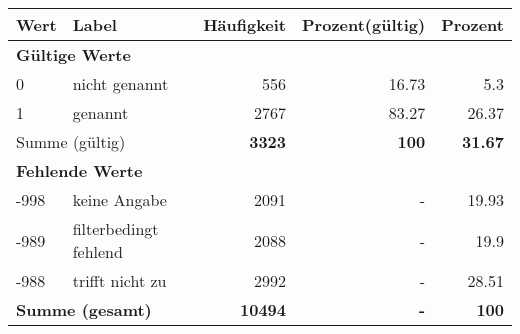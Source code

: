      \begin{longtable}{lXrrr}
     \toprule
     \textbf{Wert} & \textbf{Label} & \textbf{Häufigkeit} & \textbf{Prozent(gültig)} & \textbf{Prozent} \\
     \endhead
     \midrule
     \multicolumn{5}{l}{\textbf{Gültige Werte}}\\

     0 &
     \multicolumn{1}{X}{ nicht genannt   } &


       \num{556} &
       \num[round-mode=places,round-precision=2]{16.73} &
         \num[round-mode=places,round-precision=2]{5.3} \\

     1 &
     \multicolumn{1}{X}{ genannt   } &


       \num{2767} &
       \num[round-mode=places,round-precision=2]{83.27} &
         \num[round-mode=places,round-precision=2]{26.37} \\
     \midrule
     \multicolumn{2}{l}{Summe (gültig)} &
       \textbf{\num{3323}} &
     \textbf{\num{100}} &
       \textbf{\num[round-mode=places,round-precision=2]{31.67}} \\
     \multicolumn{5}{l}{\textbf{Fehlende Werte}}\\
       -998 &
       keine Angabe &
         \num{2091} &
        - &
         \num[round-mode=places,round-precision=2]{19.93} \\
       -989 &
       filterbedingt fehlend &
         \num{2088} &
        - &
         \num[round-mode=places,round-precision=2]{19.9} \\
       -988 &
       trifft nicht zu &
         \num{2992} &
        - &
         \num[round-mode=places,round-precision=2]{28.51} \\
     \midrule
     \multicolumn{2}{l}{\textbf{Summe (gesamt)}} &
          \textbf{\num{10494}} &
        \textbf{-} &
        \textbf{\num{100}} \\
     \bottomrule
     \end{longtable}
     
